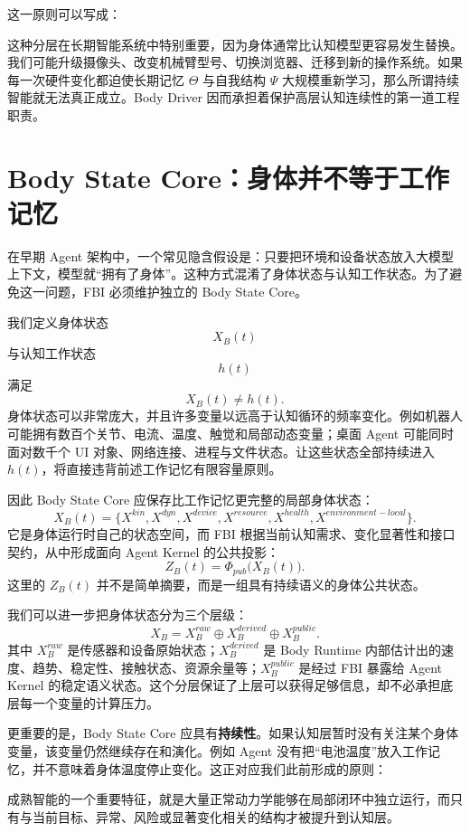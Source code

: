 这一原则可以写成：
\begin{statementbox}
\centering
{}
\end{statementbox}

这种分层在长期智能系统中特别重要，因为身体通常比认知模型更容易发生替换。我们可能升级摄像头、改变机械臂型号、切换浏览器、迁移到新的操作系统。如果每一次硬件变化都迫使长期记忆 \(\Theta\) 与自我结构 \(\Psi\) 大规模重新学习，那么所谓持续智能就无法真正成立。Body Driver 因而承担着保护高层认知连续性的第一道工程职责。


\section{Body State Core：身体并不等于工作记忆}

在早期 Agent 架构中，一个常见隐含假设是：只要把环境和设备状态放入大模型上下文，模型就“拥有了身体”。这种方式混淆了身体状态与认知工作状态。为了避免这一问题，FBI 必须维护独立的 Body State Core。

我们定义身体状态
\[
X_B(t)
\]
与认知工作状态
\[
h(t)
\]
满足
\[
\boxed{
X_B(t)\neq h(t).
}
\]
身体状态可以非常庞大，并且许多变量以远高于认知循环的频率变化。例如机器人可能拥有数百个关节、电流、温度、触觉和局部动态变量；桌面 Agent 可能同时面对数千个 UI 对象、网络连接、进程与文件状态。让这些状态全部持续进入 \(h(t)\)，将直接违背前述工作记忆有限容量原则。

因此 Body State Core 应保存比工作记忆更完整的局部身体状态：
\[
X_B(t)
=
\{
X^{kin},
X^{dyn},
X^{device},
X^{resource},
X^{health},
X^{environment-local}
\}.
\]
它是身体运行时自己的状态空间，而 FBI 根据当前认知需求、变化显著性和接口契约，从中形成面向 Agent Kernel 的公共投影：
\[
Z_B(t)
=
\Phi_{pub}
\bigl(
X_B(t)
\bigr).
\]
这里的 \(Z_B(t)\) 并不是简单摘要，而是一组具有持续语义的身体公共状态。

我们可以进一步把身体状态分为三个层级：
\[
X_B
=
X_B^{raw}
\oplus
X_B^{derived}
\oplus
X_B^{public}.
\]
其中 \(X_B^{raw}\) 是传感器和设备原始状态；\(X_B^{derived}\) 是 Body Runtime 内部估计出的速度、趋势、稳定性、接触状态、资源余量等；\(X_B^{public}\) 是经过 FBI 暴露给 Agent Kernel 的稳定语义状态。这个分层保证了上层可以获得足够信息，却不必承担底层每一个变量的计算压力。

更重要的是，Body State Core 应具有\textbf{持续性}。如果认知层暂时没有关注某个身体变量，该变量仍然继续存在和演化。例如 Agent 没有把“电池温度”放入工作记忆，并不意味着身体温度停止变化。这正对应我们此前形成的原则：
\begin{statementbox}
\centering
{}
\end{statementbox}
成熟智能的一个重要特征，就是大量正常动力学能够在局部闭环中独立运行，而只有与当前目标、异常、风险或显著变化相关的结构才被提升到认知层。

